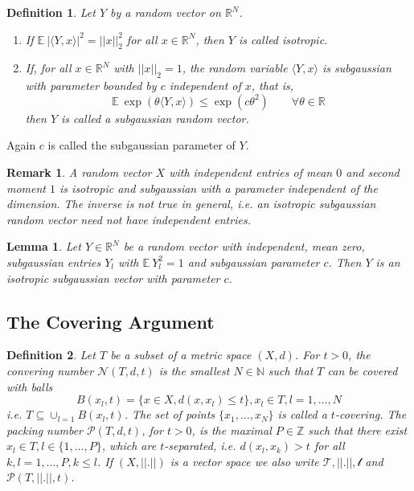 \documentclass[10pt,a4paper]{article}
\theoremstyle{thmstyle}
\newtheorem{definition}{Definition}
\newtheorem{lemma}{Lemma}
\newtheorem{remark}{Remark}
\newcommand{\E}{\mathbb{E}~}
\begin{document}
\begin{definition}
  Let $Y$ by a random vector on $\mathbb{R}^{N}$.
  \begin{enumerate}
  \item If $\E |\langle Y, x \rangle|^{2} = ||x||_{2}^{2}$ for all $x \in \mathbb{R}^{N}$, then $Y$ is called \emph{isotropic}.
  \item If, for all $x \in \mathbb{R}^{N}$ with $||x||_{2} = 1$, the random variable $\langle Y, x \rangle$ is subgaussian with parameter bounded by $c$ independent of $x$, that is,
    \begin{equation*}
      \E \exp(\theta \langle Y, x \rangle) \le \exp(c \theta^{2}) \qquad \forall \theta \in \mathbb{R}
    \end{equation*}
    then $Y$ is called a \emph{subgaussian random vector}.
  \end{enumerate}
\end{definition}

Again $c$ is called the subgaussian parameter of $Y$.

\begin{remark}
  A random vector $X$ with independent entries of mean $0$ and second moment $1$ is isotropic and subgaussian with a parameter independent of the dimension.
  The inverse is not true in general, i.e. an isotropic subgaussian random vector need not have independent entries.
\end{remark}

\begin{lemma}
  Let $Y \in \mathbb{R}^{N}$ be a random vector with independent, mean zero, subgaussian entries $Y_{l}$ with $\E Y_{l}^{2} = 1$ and subgaussian parameter $c$.
  Then $Y$ is an isotropic subgaussian vector with parameter $c$.
\end{lemma}

\subsection{The Covering Argument}

\begin{definition}
  Let $T$ be a subset of a metric space $(X, d)$.
  For $t > 0$, the \emph{convering number} $\mathcal{N}(T, d, t)$ is the smallest $N \in \mathbb{N}$ such that $T$ can be covered with balls
  \begin{equation*}
    B(x_{l}, t) = \{ x \in X, d(x, x_{l}) \le t \}, x_{l} \in T, l = 1, \dots, N
  \end{equation*}
  i.e. $T \subseteq \cup_{l = 1}^{} B(x_{l}, t)$.
  The set of points $\{ x_{1}, \dots, x_{N} \}$ is called a \emph{$t$-covering}.
  The \emph{packing number} $\mathcal{P}(T, d, t)$, for $t > 0$, is the maximal $P \in \mathbb{Z}$ such that there exist $x_{l} \in T, l \in \{ 1, \dots, P \}$, which are \emph{$t$-separated}, i.e. $d(x_{l}, x_{k}) > t$ for all $k, l = 1, \dots, P, k \le l$.
  If $(X, ||.||)$ is a vector space we also write $\mathcal{T, ||.||, t}$ and $\mathcal{P}(T, ||.||, t)$.
\end{definition}
\end{document}
